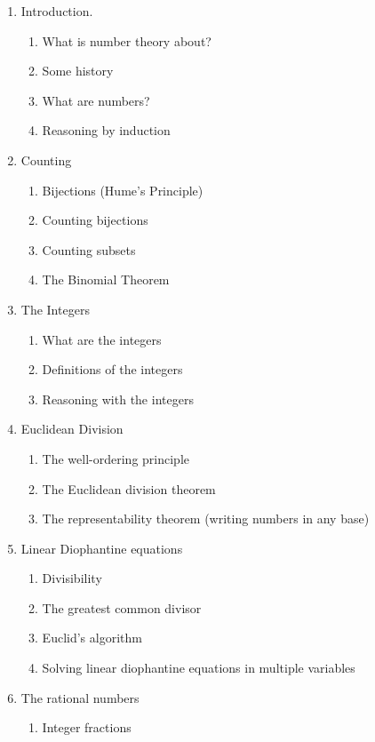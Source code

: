 \documentclass{article}
\begin{document}
\begingroup
{}
\begin{enumerate}
\item Introduction.
  \begin{enumerate}
  \item What is number theory about?
  \item Some history
  \item What are numbers?
  \item Reasoning by induction
  \end{enumerate}
\item Counting
  \begin{enumerate}
  \item Bijections (Hume's Principle)
  \item Counting bijections
  \item Counting subsets
  \item The Binomial Theorem
  \end{enumerate}
\item The Integers
  \begin{enumerate}
  \item What are the integers
  \item Definitions of the integers
  \item Reasoning with the integers
  \end{enumerate}
\item Euclidean Division
  \begin{enumerate}
  \item The well-ordering principle
  \item The Euclidean division theorem
  \item The representability theorem (writing numbers in any base)
  \end{enumerate}
\item Linear Diophantine equations
  \begin{enumerate}
  \item Divisibility
  \item The greatest common divisor
  \item Euclid's algorithm
  \item Solving linear diophantine equations in multiple variables
  \end{enumerate}
\item The rational numbers
  \begin{enumerate}
  \item Integer fractions

\end{enumerate}
\end{enumerate}
\end{document}
